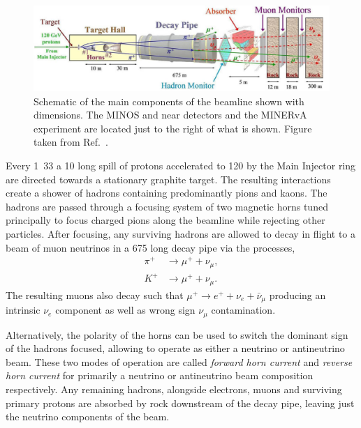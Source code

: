 \begin{figure} %
    \includegraphics[width=\textwidth]{diagrams/4-chips/numi_beam.pdf}
    \caption[Schematic of the main components of the \numi beam]
    {Schematic of the main components of the \numi beamline shown with dimensions. The MINOS and
        \nova near detectors and the MINERvA experiment are located just to the right of what is
        shown. Figure taken from Ref.~\cite{adamson2016}.}
    \label{fig:numi_beam}
\end{figure}

Every \unit{1.33}{} a \unit{10}{\mu{}} long spill of protons accelerated
to \unit{120}{\GeV} by the Main Injector ring are directed towards a stationary graphite target.
The resulting interactions create a shower of hadrons containing predominantly pions and kaons.
The hadrons are passed through a focusing system of two magnetic horns tuned principally to focus
charged pions along the beamline while rejecting other particles. After focusing, any surviving
hadrons are allowed to decay in flight to a beam of muon neutrinos in a \unit{675}{}
long decay pipe via the processes,
\begin{align} %
    \pi^{+} & \rightarrow\mu^{+}+\nu_{\mu}, \label{eq:pi_decays}   \\
    K^{+}   & \rightarrow\mu^{+}+\nu_{\mu}. \label{eq:kaon_decays}
\end{align}
The resulting muons also decay such that $\mu^{+}\rightarrow e^{+}+\nu_{e}+\bar{\nu}_{\mu}$
producing an intrinsic $\nu_{e}$ component as well as wrong sign $\nu_{\mu}$ contamination.

Alternatively, the polarity of the horns can be used to switch the dominant sign of the hadrons
focused, allowing \numi to operate as either a neutrino or antineutrino beam. These two modes of
operation are called \emph{forward horn current} and \emph{reverse horn current} for primarily a
neutrino or antineutrino beam composition respectively. Any remaining hadrons, alongside
electrons, muons and surviving primary protons are absorbed by rock downstream of the decay pipe,
leaving just the neutrino components of the beam.


